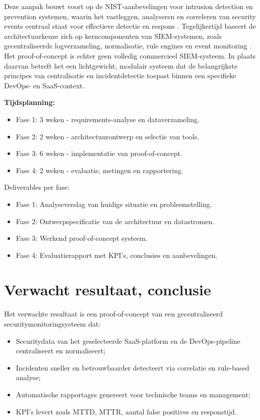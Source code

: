Deze aanpak bouwt voort op de NIST‑aanbevelingen voor intrusion detection en prevention systemen, waarin het vastleggen, analyseren en correleren van security events 
centraal staat voor effectieve detectie en respons \autocite{Scarfone_Mell_2007}. Tegelijkertijd baseert de architectuurkeuze zich op kerncomponenten van SIEM-systemen, 
zoals gecentraliseerde logverzameling, normalisatie, rule engines en event monitoring \autocite{s21144759}.
Het proof-of-concept is echter geen volledig commercieel SIEM-systeem. In plaats daarvan betreft het een lichtgewicht, modulair systeem dat de belangrijkste principes 
van centralisatie en incidentdetectie toepast binnen een specifieke DevOps- en SaaS-context.

\textbf{Tijdsplanning:}
\begin{itemize}
    \item Fase 1: 3 weken - requirements-analyse en dataverzameling.
    \item Fase 2: 2 weken - architectuurontwerp en selectie van tools.
    \item Fase 3: 6 weken - implementatie van proof-of-concept.
    \item Fase 4: 2 weken - evaluatie, metingen en rapportering.
\end{itemize}

Deliverables per fase:
\begin{itemize}
    \item Fase 1: Analyseverslag van huidige situatie en probleemstelling.
    \item Fase 2: Ontwerpspecificatie van de architectuur en datastromen.
    \item Fase 3: Werkend proof-of-concept systeem.
    \item Fase 4: Evaluatierapport met KPI’s, conclusies en aanbevelingen.
\end{itemize}

\section{Verwacht resultaat, conclusie}%
\label{sec:verwachte_resultaten}
Het verwachte resultaat is een proof-of-concept van een gecentraliseerd securitymonitoringsysteem dat:

\begin{itemize}
    \item Securitydata van het geselecteerde SaaS-platform en de DevOps-pipeline centraliseert en normaliseert;
    \item Incidenten sneller en betrouwbaarder detecteert via correlatie en rule-based analyse;
    \item Automatische rapportages genereert voor technische teams en management;
    \item KPI’s levert zoals MTTD, MTTR, aantal false positives en responstijd.
\end{itemize}

